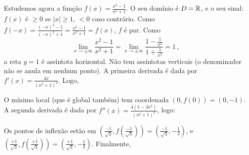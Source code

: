 \begin{ex}
Estudemos agora a função $f(x)=\frac{x^2-1}{x^2+1}$.
O seu domínio é $D=\mathbb{R}$, e o seu sinal: $f(x)$ é $\geq 0$ se $|x|\geq 1$,
$<0$ caso contrário.
Como $f(-x)=\frac{(-x)^2-1}{(-x)^2+1}=\frac{x^2-1}{x^2+1}=f(x)$, $f$ é par.
Como 
$$
\lim_{x\to \pm \infty}\frac{x^2-1}{x^2+1}=\lim_{x\to \pm
\infty}\frac{1-\tfrac{1}{x^2}}{1+\tfrac{1}{x^2}}=1\,,
$$
a reta $y=1$ é assíntota horizontal. Não tem assíntotas verticais (o
denominador não se anula em nenhum ponto).
A primeira derivada é dada por $f'(x)=\frac{4x}{(x^2+1)^2}$. Logo,
\begin{center}
\begin{bmlimage}\end{bmlimage}
\end{center}
O mínimo local (que é global também) tem coordenada $(0,f(0))=(0,-1)$. A
segunda derivada é dada por
$f''(x)=\frac{4(1-3x^2)}{(x^2+1)^3}$, logo:
\begin{center}
\begin{bmlimage}\end{bmlimage}
\end{center}
Os pontos de inflexão estão em
$(\tfrac{-1}{\sqrt{3}},f(\tfrac{-1}{\sqrt{3}}))=(\tfrac{-1}{\sqrt{3}},-\tfrac{1}
{2})$,
e
$(\tfrac{+1}{\sqrt{3}},f(\tfrac{+1}{\sqrt{3}}))=(\tfrac{+1}{\sqrt{3}},-\tfrac{1
}{2})$. Finalmente,
\begin{center}
\begin{bmlimage}\end{bmlimage}
\end{center}
\end{ex}


